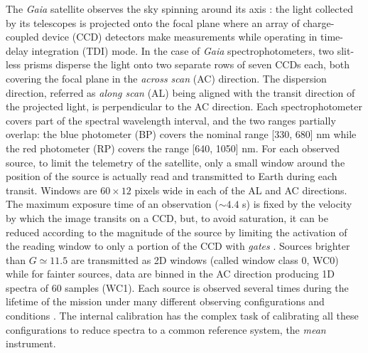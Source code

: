 \documentclass{aa}
\newcommand{\gaia}{\textit{Gaia}\xspace}
\begin{document}
The \gaia satellite observes the sky spinning around its axis \citep{Prusti2016}: the light collected by its telescopes is projected onto the focal plane where an array of charge-coupled device (CCD) detectors make measurements while operating in time-delay integration (TDI) mode. In the case of \gaia spectrophotometers, two slit-less prisms disperse the light onto two separate rows of seven CCDs each, both covering the focal plane in the \emph{across scan} (AC) direction. The dispersion direction, referred as \emph{along scan} (AL) being aligned with the transit direction of the projected light, is perpendicular to the AC direction. Each spectrophotometer covers part of the spectral wavelength interval, and the two ranges  partially overlap: the blue photometer (BP) covers the nominal range [330, 680] nm while the red photometer (RP) covers the range [640, 1050] nm. 
For each observed source, to limit the telemetry of the satellite, only a small window around the position of the source is actually read and transmitted to Earth during each transit.
Windows are $60\times12$ pixels wide in each of the AL and AC directions. The maximum exposure time of an observation ($\sim4.4$ s) is fixed by the velocity by which the image transits on a CCD, but, to avoid saturation, it can be reduced according to the magnitude of the source by limiting the activation of the reading window to only a portion of the CCD  with
\emph{gates} \citep{DeAngeli2022}.
Sources brighter than $G\simeq11.5$ are transmitted as 2D windows (called window class 0, WC0) while for fainter sources, data are binned in the AC direction producing 1D spectra of 60 samples (WC1). Each source is observed several times during the lifetime of the mission under many different observing configurations and conditions \citep[see][for an exhaustive description]{Carrasco2021}. The internal calibration \citep{DeAngeli2022} has the complex task of calibrating all these configurations to reduce spectra to a common reference system, the \emph{mean} instrument. 
\end{document}
